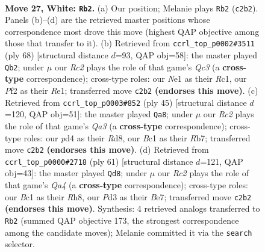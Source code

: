 \documentclass[11pt]{article}
\begin{document}
\clearpage

\begin{figure}[p]\centering
\begin{subfigure}{0.46\textwidth}\centering
\resizebox{\linewidth}{!}{%
\newchessgame
\chessboard[
  setfen={2rq3r/4bp1k/2n2n2/p6p/1p1p2p1/1P1P2P1/P1R1QP1P/RNB1N1K1 w - - 10 27},
  showmover=false,
  pgfstyle=straightmove, color=movearrow, markmove={c2-b2}
]}
\caption{}
\end{subfigure}\hfill
\begin{subfigure}{0.46\textwidth}\centering
\resizebox{\linewidth}{!}{%
\newchessgame
\chessboard[
  setfen={3r2k1/pbr1qp2/4nn1p/2ppN1p1/8/PPQ1P1PP/3N1PB1/2R1R1K1 w - - 3 35},
  showmover=false,
  pgfstyle=straightmove, color=movearrow, markmove={c3-b2}
]}
\caption{}
\end{subfigure}
\\[4pt]
\begin{subfigure}{0.46\textwidth}\centering
\resizebox{\linewidth}{!}{%
\newchessgame
\chessboard[
  setfen={3r2k1/1rnnppbp/q2p2p1/P1pP4/Q3PP2/R1N2N1P/1P1B2PK/1R6 b - - 12 23},
  showmover=false,
  pgfstyle=straightmove, color=movearrow, markmove={a6-a8}
]}
\caption{}
\end{subfigure}\hfill
\begin{subfigure}{0.46\textwidth}\centering
\resizebox{\linewidth}{!}{%
\newchessgame
\chessboard[
  setfen={2n4r/4bpk1/r3p2p/q2pP2p/2pP4/2P2N2/2RB1PP1/3QR1K1 b - - 1 31},
  showmover=false,
  pgfstyle=straightmove, color=movearrow, markmove={a5-d8}
]}
\caption{}
\end{subfigure}
\caption{\textbf{Move 27, White: \texttt{Rb2}.} (a) Our position; Melanie plays \texttt{Rb2} (\texttt{c2b2}). Panels (b)--(d) are the retrieved master positions whose correspondence most drove this move (highest QAP objective among those that transfer to it). (b) Retrieved from \texttt{ccrl\_top\_p0002\#3511} (ply 68) [structural distance $d$=93, QAP obj=58]: the master played \texttt{Qb2}; under $\mu$ our \emph{Rc2} plays the role of that game's \emph{Qc3} (a \textbf{cross-type} correspondence); cross-type roles: our \emph{N}e1 as their \emph{R}c1, our \emph{P}f2 as their \emph{R}e1; transferred move \texttt{c2b2} \textbf{(endorses this move)}. (c) Retrieved from \texttt{ccrl\_top\_p0003\#852} (ply 45) [structural distance $d$=120, QAP obj=51]: the master played \texttt{Qa8}; under $\mu$ our \emph{Rc2} plays the role of that game's \emph{Qa3} (a \textbf{cross-type} correspondence); cross-type roles: our \emph{p}d4 as their \emph{R}d8, our \emph{B}c1 as their \emph{R}b7; transferred move \texttt{c2b2} \textbf{(endorses this move)}. (d) Retrieved from \texttt{ccrl\_top\_p0000\#2718} (ply 61) [structural distance $d$=121, QAP obj=43]: the master played \texttt{Qd8}; under $\mu$ our \emph{Rc2} plays the role of that game's \emph{Qa4} (a \textbf{cross-type} correspondence); cross-type roles: our \emph{B}c1 as their \emph{R}h8, our \emph{P}d3 as their \emph{B}e7; transferred move \texttt{c2b2} \textbf{(endorses this move)}. Synthesis: 4 retrieved analogs transferred to \texttt{Rb2} (summed QAP objective 173, the strongest correspondence among the candidate moves); Melanie committed it via the \texttt{search} selector.}
\label{fig:thought-m52}
\end{figure}
\end{document}
